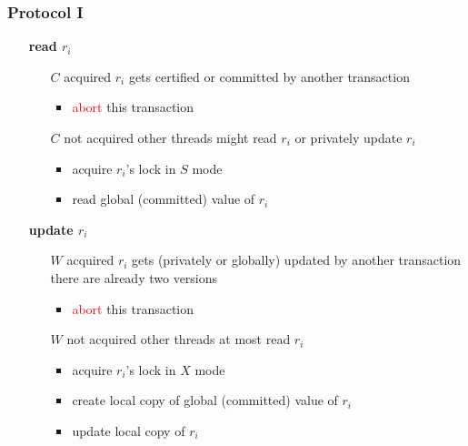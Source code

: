 \begin{frame}
	\frametitle{Protocol I}
	
	\begin{itemize}
		\item[\textbf{read $r_i$}]	\hfill
							\begin{itemize}
								\item[$C$ acquired]	$r_i$ gets certified or committed by another transaction
															\begin{itemize}
																\item	\textcolor{red}{abort} this transaction
															\end{itemize}
								\item[$C$ not acquired]	other threads might read $r_i$ or privately update $r_i$
															\begin{itemize}
																\item	acquire $r_i$'s lock in $S$ mode
																\item	read global (committed) value of $r_i$
															\end{itemize}
							\end{itemize}
		\item[\textbf{update $r_i$}]	\hfill
							\begin{itemize}
								\item[$W$ acquired]	$r_i$ gets (privately or globally) updated by another transaction \\ \bm{$\rightarrow$} there are already two versions
															\begin{itemize}
																\item	\textcolor{red}{abort} this transaction
															\end{itemize}
								\item[$W$ not acquired]	other threads at most read $r_i$
															\begin{itemize}
																\item	acquire $r_i$'s lock in $X$ mode
																\item	create local copy of global (committed) value of $r_i$
																\item	update local copy of $r_i$
															\end{itemize}
							\end{itemize}
	\end{itemize}
\end{frame}


